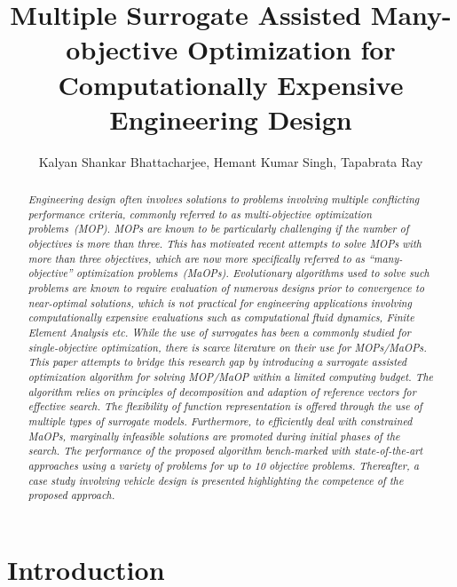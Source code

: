 \documentclass[twocolumn,10pt]{asme2ej}
\title{Multiple Surrogate Assisted Many-objective Optimization for Computationally Expensive Engineering Design}
\author{Kalyan Shankar Bhattacharjee, Hemant Kumar Singh, Tapabrata Ray
	\affiliation{
		School of Engineering and IT, The University of New South Wales, Canberra, Australia\\
		Email: k.bhattacharjee@student.adfa.edu.au, \{h.singh,t.ray\}adfa.edu.au\\
	}	
}
\begin{document}
\maketitle    


\begin{abstract}
	{\it Engineering design often involves solutions to problems involving
multiple conflicting performance criteria, commonly
referred to as multi-objective optimization problems~(MOP).
MOPs are known to be particularly challenging if the number
of objectives is more than three. This has motivated recent attempts to solve MOPs with more than
three objectives, which are now more specifically referred to
as ``many-objective'' optimization problems~(MaOPs). Evolutionary algorithms used to solve such problems are known to require
evaluation of numerous designs prior to convergence
to near-optimal solutions, which is not practical for engineering applications involving computationally
expensive evaluations such as computational fluid
dynamics, Finite Element Analysis etc. While
the use of surrogates has been a commonly studied for single-objective
optimization, there is scarce literature on their use
for MOPs/MaOPs. This paper attempts
to bridge this research gap by introducing a surrogate assisted
optimization algorithm for solving MOP/MaOP within a limited computing
budget. The algorithm relies on principles of decomposition
and adaption of reference vectors for effective search.
The flexibility of function representation is offered through
the use of multiple types of surrogate models. Furthermore,
to efficiently deal with constrained MaOPs, marginally infeasible
solutions are promoted during initial phases of the
search. The performance of the proposed algorithm bench-marked with state-of-the-art approaches
using a variety of problems for up to 10 objective problems. Thereafter, a
case study involving vehicle design is presented
highlighting the competence of the proposed approach.}
\end{abstract}


\section{Introduction}
\label{sec:KHTsec:1}
\end{document}
